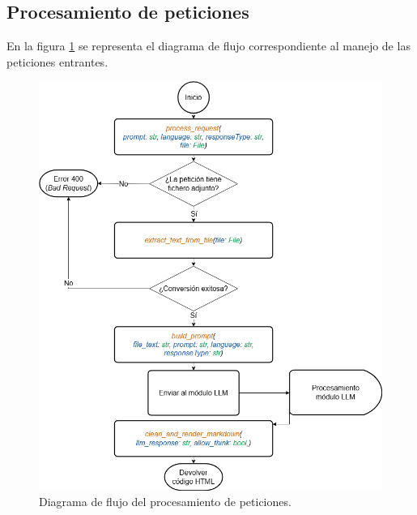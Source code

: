 \pagebreak
\subsection{Procesamiento de peticiones}
En la figura \ref{fig:flux} se representa el diagrama de flujo correspondiente al manejo de las peticiones entrantes.

\begin{figure}[htbp]
	\centering
	\includegraphics[width=1\textwidth]{./Figures/flux-diagram.png}
	\caption{Diagrama de flujo del procesamiento de peticiones.}
	\label{fig:flux}
\end{figure}

